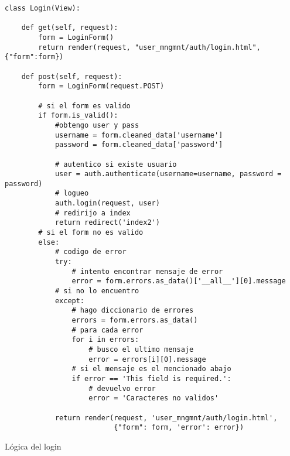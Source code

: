 \begin{listing}[H]
\begin{verbatim}
class Login(View):

    def get(self, request):
        form = LoginForm()
        return render(request, "user_mngmnt/auth/login.html", {"form":form})
    
    def post(self, request):
        form = LoginForm(request.POST)

        # si el form es valido
        if form.is_valid():
            #obtengo user y pass
            username = form.cleaned_data['username']
            password = form.cleaned_data['password']

            # autentico si existe usuario
            user = auth.authenticate(username=username, password = password)
            # logueo
            auth.login(request, user)
            # redirijo a index
            return redirect('index2')
        # si el form no es valido
        else:
            # codigo de error
            try:
                # intento encontrar mensaje de error
                error = form.errors.as_data()['__all__'][0].message
            # si no lo encuentro
            except:
                # hago diccionario de errores
                errors = form.errors.as_data()
                # para cada error
                for i in errors:
                    # busco el ultimo mensaje
                    error = errors[i][0].message
                # si el mensaje es el mencionado abajo
                if error == 'This field is required.':
                    # devuelvo error
                    error = 'Caracteres no validos'
                
            return render(request, 'user_mngmnt/auth/login.html', 
                          {"form": form, 'error': error})
\end{verbatim}
\caption{Lógica del login}
\label{login_user_mngmnt}
\end{listing}





